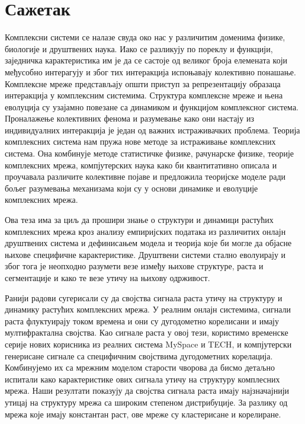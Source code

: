 \normalsize

\chapter*{{\selectfont Сажетак}}


Комплексни системи се налазе свуда око нас у различитим доменима физике, биологије и друштвених наука. Иако се разликују по пореклу и функцији, заједничка карактеристика им је да се састоје од великог броја елемената који међусобно интерагују и због тих интеракција испоњавају колективно понашање. Комплексне мреже представљају општи приступ за репрезентацију образаца интеракција у комплексним системима. Структура комплексне мреже и њена еволуција су узајамно повезане са динамиком и функцијом комплексног система. Проналажење колективних фенома и разумевање како они настају из индивидуалних интеракција је један од важних истраживачких проблема. Теорија комплексних система нам пружа нове методе за истраживање комплексних система. Она комбинује методе статистичке физике, рачунарске физике, теорије комплексних мрежа, компјутерских наука како би квантитативно описала и проучавала различите колективне појаве и предложила теоријске моделе ради бољег разумевања механизама који су у основи динамике и еволуције комплексних мрежа. 

Ова теза има за циљ да прошири знање о структури и динамици растућих комплексних мрежа кроз анализу емпиријских података из различитих онлајн друштвених система и дефинисањем модела и теорија које би могле да објасне њихове специфичне карактеристике. Друштвени системи стално еволуирају и због тога је неопходно разумети везе између њихове структуре, раста и сегментације и како те везе утичу на њихову одрживост.

Ранији радови сугерисали су да својства сигнала раста утичу на структуру и динамику растућих комплексних мрежа. У реалним онлајн системима, сигнали раста флуктуирају током времена и они су дугодометно корелисани и имају мултифрактална својства. Као сигнале раста у овој тези, користимо временске серије нових корисника из реалних система {MySpace} и {TECH}, и компјутерски генерисане сигнале са специфичним својствима дугодометних корелација. Комбинујемо их са мрежним моделом старости чворова да бисмо детаљно испитали како карактеристике ових сигнала утичу на структуру комплесних мрежа. Наши резултати показују да својства сигнала раста имају најзначајнији утицај на структуру мрежа са широким степеном дистрибуције. За разлику од мрежа које имају константан раст, ове мреже су кластерисане и корелиране.

